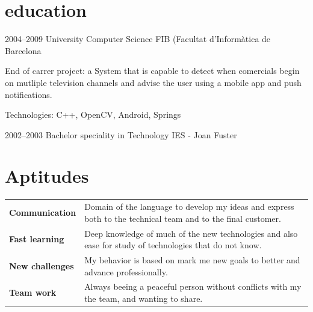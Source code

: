 \documentclass[]{friggeri-cv} %
\begin{document}

\section{education}

\begin{entrylist}
\entry
{2004--2009}
{University {\normalfont Computer Science}}
{FIB (Facultat d'Informàtica de Barcelona}
{End of carrer project: a System that is capable to detect when comercials begin on mutliple television channels and advise the user using a mobile app and push notifications.


Technologies: C++, OpenCV, Android, Springs}
\entry
{2002--2003}
{Bachelor {\normalfont speciality in Technology}}
{IES - Joan Fuster}
{}
\end{entrylist}

\newpage

\section{Aptitudes}


\begin{tabular}{p{3cm}p{10.8cm}}
\textbf{Communication} & Domain of the language to develop my ideas and express both to the technical team and to the final customer.
\vspace{\parsep}
\\
\textbf{Fast learning} & Deep knowledge of much of the new technologies and also ease for study of technologies that do not know.
\vspace{\parsep}
\\
\textbf{New challenges} & My behavior is based on mark me new goals to better and advance professionally.
\vspace{\parsep}
\\
\textbf{Team work} & Always beeing a peaceful person without conflicts with my the team, and wanting to share.
\vspace{\parsep}
\\
\end{tabular}
\end{document}
